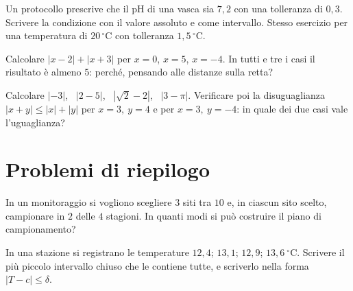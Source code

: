 \begin{esercizio}[\liv{2}]
Un protocollo prescrive che il pH di una vasca sia $7{,}2$ con una tolleranza di $0{,}3$. Scrivere la condizione con il valore assoluto e come intervallo. Stesso esercizio per una temperatura di $20\,^\circ$C con tolleranza $1{,}5\,^\circ$C.
\end{esercizio}

\begin{esercizio}[\liv{2}]
Calcolare $|x-2|+|x+3|$ per $x=0$, $x=5$, $x=-4$. In tutti e tre i casi il risultato è almeno $5$: perché, pensando alle distanze sulla retta?
\end{esercizio}

\begin{esercizio}[\liv{1}]
Calcolare $|-3|$, \ $|2-5|$, \ $|\sqrt2-2|$, \ $|3-\pi|$. Verificare poi la disuguaglianza $|x+y|\le|x|+|y|$ per $x=3,\ y=4$ e per $x=3,\ y=-4$: in quale dei due casi vale l'uguaglianza?
\end{esercizio}

\section{Problemi di riepilogo}

\begin{esercizio}[\liv{2}]
In un monitoraggio si vogliono scegliere $3$ siti tra $10$ e, in ciascun sito scelto, campionare in $2$ delle $4$ stagioni. In quanti modi si pu\`o costruire il piano di campionamento?
\end{esercizio}

\begin{esercizio}[\liv{1}]
In una stazione si registrano le temperature $12{,}4$; $13{,}1$; $12{,}9$; $13{,}6\ ^\circ$C. Scrivere il più piccolo intervallo chiuso che le contiene tutte, e scriverlo nella forma $|T-c|\le\delta$.
\end{esercizio}


